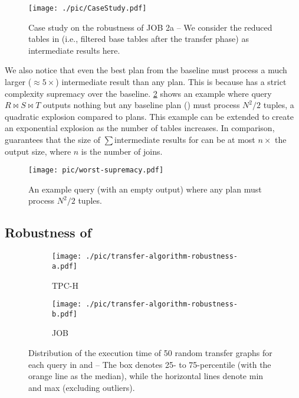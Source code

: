 \begin{figure}[t!]
    \centering
    \texttt{[image: ./pic/CaseStudy.pdf]}
    \caption{Case study on the robustness of JOB 2a \textnormal{-- We consider the reduced tables in \rpt (i.e., filtered base tables after the transfer phase) as intermediate results here.}}
    \label{fig:case}
\end{figure}

We also notice that even the best plan from the baseline must process a much larger ($\approx$$5\times$) intermediate result than any \rpt plan. This is because \rpt has a strict complexity supremacy over the baseline. \cref{fig:worst-supremacy} shows an example where query $R \Join S \Join T$ outputs nothing but any baseline plan (\NoPT) must process $N^2/2$ tuples, a quadratic explosion compared to \rpt plans. This example can be extended to create an exponential explosion as the number of tables increases. In comparison, \YannAlg guarantees that the size of $\sum$intermediate results for \rpt can be at most $n\times$ the output size, where $n$ is the number of joins.

\begin{figure}[t!]
    \centering
    \texttt{[image: pic/worst-supremacy.pdf]}
    \caption{An example query (with an empty output) where any \NoPT plan must process $N^2/2$ tuples.}
    \label{fig:worst-supremacy}
\end{figure}

\subsection{Robustness of \TreeStruct}
\label{sec:eval:largestroot}

\begin{figure*}[t!]
    \centering
    \begin{subfigure}{0.39\linewidth}
        \texttt{[image: ./pic/transfer-algorithm-robustness-a.pdf]}
        \caption{TPC-H}
        \label{fig:transfer-robustness-tpch}
    \end{subfigure}
    \begin{subfigure}{0.57\linewidth}
        \texttt{[image: ./pic/transfer-algorithm-robustness-b.pdf]}
        \caption{JOB}
        \label{fig:transfer-robustness-job}
    \end{subfigure}
    \caption{Distribution of the execution time of 50 random \TreeStruct transfer graphs for each query in \tpch and \job \textnormal{-- The box denotes 25- to 75-percentile (with the orange line as the median), while the horizontal lines denote min and max (excluding outliers).}}
    \label{fig:transfer-robustness}
\end{figure*}

